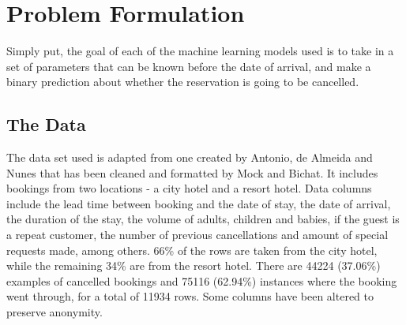 \documentclass[10pt,conference]{IEEEtran}
\begin{document}
\section{Problem Formulation}
  Simply put, the goal of each of the machine learning models used is to take in a set of parameters that can be known before the date of arrival, and make a binary prediction about whether the reservation is going to be cancelled.
  \subsection{The Data}
    The data set used is adapted from one created by Antonio, de Almeida and Nunes\cite{Antonio2019} that has been cleaned and formatted by Mock and Bichat\cite{mock_bichat}. It includes bookings from two locations - a city hotel and a resort hotel. Data columns include the lead time between booking and the date of stay, the date of arrival, the duration of the stay, the volume of adults, children and babies, if the guest is a repeat customer, the number of previous cancellations and amount of special requests made, among others. 66\% of the rows are taken from the city hotel, while the remaining 34\% are from the resort hotel. There are 44224 (37.06\%) examples of cancelled bookings and 75116 (62.94\%) instances where the booking went through, for a total of 11934 rows. Some columns have been altered to preserve anonymity\cite{Antonio2019}.
  
  
\end{document}

